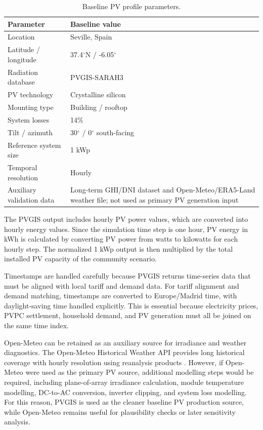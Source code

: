 \begin{table}[htbp]
\centering
\caption{Baseline PV profile parameters.}
\label{tab:ch3_pv_profile_parameters}
\begin{tabular}{p{}p{}}
\toprule
\textbf{Parameter} & \textbf{Baseline value} \\
\midrule
Location & Seville, Spain \\
Latitude / longitude & 37.4$^\circ$N / -6.05$^\circ$ \\
Radiation database & PVGIS-SARAH3 \\
PV technology & Crystalline silicon \\
Mounting type & Building / rooftop \\
System losses & 14\% \\
Tilt / azimuth & 30$^\circ$ / 0$^\circ$ south-facing \\
Reference system size & 1 kWp \\
Temporal resolution & Hourly \\
Auxiliary validation data & Long-term GHI/DNI dataset and Open-Meteo/ERA5-Land weather file; not used as primary PV generation input \\
\bottomrule
\end{tabular}
\end{table}

The PVGIS output includes hourly PV power values, which are converted into hourly energy values. Since the simulation time step is one hour, PV energy in kWh is calculated by converting PV power from watts to kilowatts for each hourly step. The normalized 1 kWp output is then multiplied by the total installed PV capacity of the community scenario.

Timestamps are handled carefully because PVGIS returns time-series data that must be aligned with local tariff and demand data. For tariff alignment and demand matching, timestamps are converted to Europe/Madrid time, with daylight-saving time handled explicitly. This is essential because electricity prices, PVPC settlement, household demand, and PV generation must all be joined on the same time index.

Open-Meteo can be retained as an auxiliary source for irradiance and weather diagnostics. The Open-Meteo Historical Weather API provides long historical coverage with hourly resolution using reanalysis products \cite{openmeteondopen}. However, if Open-Meteo were used as the primary PV source, additional modelling steps would be required, including plane-of-array irradiance calculation, module temperature modelling, DC-to-AC conversion, inverter clipping, and system loss modelling. For this reason, PVGIS is used as the cleaner baseline PV production source, while Open-Meteo remains useful for plausibility checks or later sensitivity analysis.

